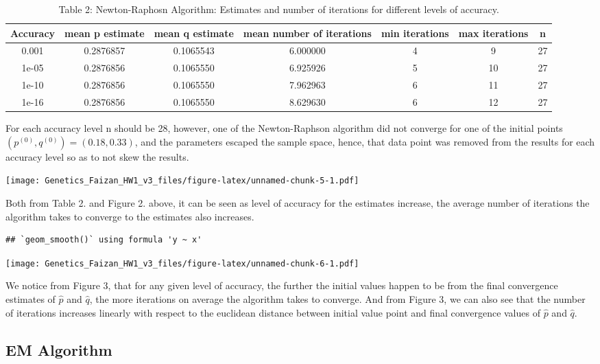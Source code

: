 \documentclass[]{article}
\begin{document}
\begin{table}[t]

\caption{\label{tab:unnamed-chunk-4}Table 2: Newton-Raphosn Algorithm: Estimates and number of iterations for different levels of accuracy.}
\centering
\begin{tabular}{c|c|c|c|c|c|c}
\hline
Accuracy & mean p estimate & mean q estimate & mean number of iterations & min iterations & max iterations & n\\
\hline
0.001 & 0.2876857 & 0.1065543 & 6.000000 & 4 & 9 & 27\\
\hline
1e-05 & 0.2876856 & 0.1065550 & 6.925926 & 5 & 10 & 27\\
\hline
1e-10 & 0.2876856 & 0.1065550 & 7.962963 & 6 & 11 & 27\\
\hline
1e-16 & 0.2876856 & 0.1065550 & 8.629630 & 6 & 12 & 27\\
\hline
\end{tabular}
\end{table}

For each accuracy level n should be 28, however, one of the
Newton-Raphson algorithm did not converge for one of the initial points
\((p^{(0)}, q^{(0)}) = (0.18 , 0.33 )\), and the parameters escaped the
sample space, hence, that data point was removed from the results for
each accuracy level so as to not skew the results.

\texttt{[image: Genetics\_Faizan\_HW1\_v3\_files/figure-latex/unnamed-chunk-5-1.pdf]}

Both from Table 2. and Figure 2. above, it can be seen as level of
accuracy for the estimates increase, the average number of iterations
the algorithm takes to converge to the estimates also increases.

\begin{verbatim}
## `geom_smooth()` using formula 'y ~ x'
\end{verbatim}

\texttt{[image: Genetics\_Faizan\_HW1\_v3\_files/figure-latex/unnamed-chunk-6-1.pdf]}

We notice from Figure 3, that for any given level of accuracy, the
further the initial values happen to be from the final convergence
estimates of \(\hat{p}\) and \(\hat{q}\), the more iterations on average
the algorithm takes to converge. And from Figure 3, we can also see that
the number of iterations increases linearly with respect to the
euclidean distance between initial value point and final convergence
values of \(\hat{p}\) and \(\hat{q}\).

\subsection{EM Algorithm}\label{em-algorithm}
\end{document}
